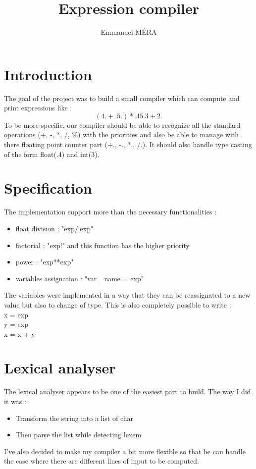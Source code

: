 \documentclass[12pt,a4paper]{article}
\author{Emmanuel MÉRA}
\title{Expression compiler}
\begin{document}
\maketitle
\section{Introduction}
The goal of the project was to build a small compiler which can compute and print expressions like :
\[
	(4.+.5.)*.45.3+2.
\]
To be more specific, our compiler should be able to recognize all the standard operations (+, -, *, /, \%) with the priorities and also be able to manage with there floating point counter part (+., -., *., /.). It should also handle type casting of the form float(.4) and int(3).

\section{Specification}
The implementation support more than the necessary functionalities :
\begin{itemize}
	\item float division : "exp/.exp"
	\item factorial : "exp!" and this function has the higher priority
	\item power : "exp**exp"
	\item variables assignation : "var\_ name = exp"
\end{itemize}
The variables were implemented in a way that they can be reassignated to a new value but also to change of type. This is also completely possible to write :\\
x = exp\\
y = exp\\
x = x + y

\section{Lexical analyser}
The lexical analyser appears to be one of the easiest part to build. The way I did it was :
\begin{itemize}
	\item Transform the string into a list of char
	\item Then parse the list while detecting lexem
\end{itemize}
I've also decided to make my compiler a bit more flexible so that he can handle the case where there are different lines of input to be computed.
\end{document}
